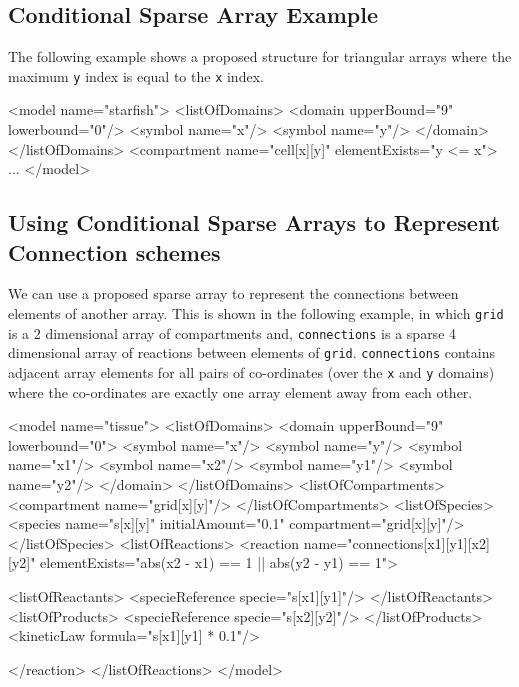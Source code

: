 \documentclass{cekarticle}
\begin{document}
\subsection{Conditional Sparse Array Example}
\label{sec:sparseeg}

The following example shows a proposed structure for triangular
arrays where the maximum \texttt{y} index is equal to the
\texttt{x} index.

\begin{example}
<model name="starfish">
    <listOfDomains>
        <domain upperBound="9" lowerbound="0"/>
            <symbol name="x"/>
            <symbol name="y"/>
        </domain>
    </listOfDomains>
    <compartment name="cell[x][y]" elementExists="y <= x">
    ...
</model>
\end{example}

\subsection{Using Conditional Sparse Arrays to Represent Connection schemes}
\label{sec:connections}

We can use a proposed sparse array to represent the connections
between elements of another array.  This is shown in the
following example, in which \texttt{grid} is a 2 dimensional
array of compartments and, \texttt{connections} is a sparse 4
dimensional array of reactions between elements of \texttt{grid}.
\texttt{connections} contains adjacent array elements for all
pairs of co-ordinates (over the \texttt{x} and \texttt{y}
domains) where the co-ordinates are exactly one array element
away from each other.

\begin{example}
<model name="tissue">
    <listOfDomains>
        <domain upperBound="9" lowerbound="0">
            <symbol name="x"/>
            <symbol name="y"/>
            <symbol name="x1"/>
            <symbol name="x2"/>
            <symbol name="y1"/>
            <symbol name="y2"/>
        </domain>
    </listOfDomains>
    <listOfCompartments>
        <compartment name="grid[x][y]"/>
    </listOfCompartments>
    <listOfSpecies>
        <species name="s[x][y]" initialAmount="0.1" compartment="grid[x][y]"/>
    </listOfSpecies>
    <listOfReactions>
        <reaction
                name="connections[x1][y1][x2][y2]"
                elementExists="abs(x2 - x1) == 1 || abs(y2 - y1) == 1">

            <listOfReactants>
                <specieReference specie="s[x1][y1]"/>
            </listOfReactants>
            <listOfProducts>
                <specieReference specie="s[x2][y2]"/>
            </listOfProducts>
            <kineticLaw formula="s[x1][y1] * 0.1"/>

        </reaction>
    </listOfReactions>
</model>
\end{example}
\end{document}
